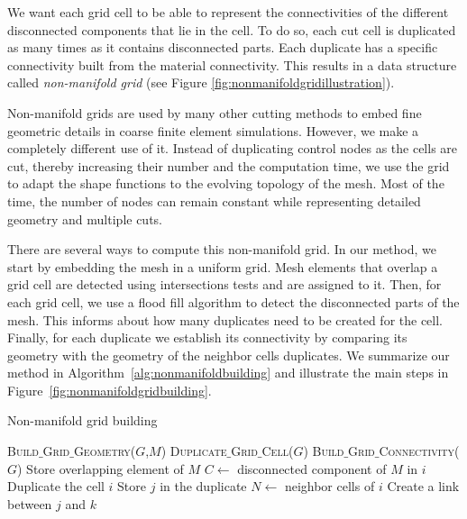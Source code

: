 We want each grid cell to be able to represent  the connectivities of the different disconnected components that lie in the cell. To do so, each cut cell is duplicated as many times as it contains disconnected parts. Each duplicate has a specific connectivity built from the material connectivity. This results in a data structure called \emph{non-manifold grid} (see Figure \ref{fig:nonmanifoldgridillustration}).

Non-manifold grids are used by many other cutting methods to embed fine geometric details in coarse finite element simulations. However, we make a completely different use of it. Instead of duplicating control nodes as the cells are cut, thereby increasing their number and the computation time, we use the grid to adapt the shape functions to the evolving topology of the mesh. Most of the time, the number of nodes can remain constant while representing detailed geometry and multiple cuts.

There are several ways to compute this non-manifold grid. In our method, we start by embedding the mesh in a uniform grid. Mesh elements that overlap a grid cell are detected using intersections tests and are assigned to it. Then, for each grid cell, we use a flood fill algorithm to detect the disconnected parts of the mesh. This informs about how many duplicates need to be created for the cell. Finally, for each duplicate we establish its connectivity by comparing its geometry with the geometry of the neighbor cells duplicates. We summarize our method in Algorithm~\ref{alg:nonmanifoldbuilding} and illustrate the main steps in Figure~\ref{fig:nonmanifoldgridbuilding}.

\begin{algorithm}[!ht]
\caption[Frame-based cutting: Non-manifold grid building]{\label{alg:nonmanifoldbuilding}Non-manifold grid building}
\begin{algorithmic}[1]
\State \textsc{Build$\_$Grid$\_$Geometry}($G$,$M$)
\State \textsc{Duplicate$\_$Grid$\_$Cell}($G$)
\State \textsc{Build$\_$Grid$\_$Connectivity}($G$)
\EndProcedure
\State
{}
\State Store overlapping element of $M$
\EndFor
\EndProcedure
\State
{}
\State $C \gets $ disconnected component of $M$ in $i$
	\State Duplicate the cell $i$
	\State Store $j$ in the duplicate
\EndFor
\EndFor
\EndProcedure
\State
{}
\State $N \gets $ neighbor cells of $i$
\State Create a link between $j$ and $k$ 
\EndIf
\EndFor
\EndFor
\EndFor
\EndProcedure
\end{algorithmic}
\end{algorithm}

